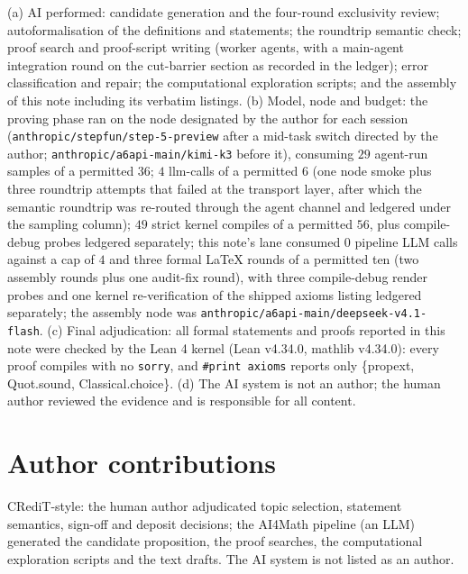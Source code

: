 \documentclass[11pt]{article}
\begin{document}
(a) AI performed: candidate generation and the four-round exclusivity
review; autoformalisation of the definitions and statements; the roundtrip
semantic check; proof search and proof-script writing (worker agents, with
a main-agent integration round on the cut-barrier section as recorded in
the ledger); error classification and repair; the computational exploration
scripts; and the assembly of this note including its verbatim listings.
(b) Model, node and budget: the proving phase ran on the node designated
by the author for each session (\texttt{anthropic/stepfun/step-5-preview}
after a mid-task switch directed by the author; \texttt{anthropic/a6api-main/kimi-k3}
before it), consuming $29$ agent-run samples of a permitted $36$; $4$
llm-calls of a permitted $6$ (one node smoke plus three roundtrip attempts
that failed at the transport layer, after which the semantic roundtrip was
re-routed through the agent channel and ledgered under the sampling
column); $49$ strict kernel compiles of a permitted $56$, plus
compile-debug probes ledgered separately; this note's lane consumed $0$
pipeline LLM calls against a cap of $4$ and three formal LaTeX rounds of a
permitted ten (two assembly rounds plus one audit-fix round), with three
compile-debug render probes and one kernel re-verification of the shipped
axioms listing ledgered separately; the assembly node was
\texttt{anthropic/a6api-main/deepseek-v4.1-flash}. (c) Final adjudication: all formal statements and proofs
reported in this note were checked by the Lean 4 kernel (Lean v4.34.0,
mathlib v4.34.0): every proof compiles with no \texttt{sorry}, and
\texttt{\#print axioms} reports only \{propext, Quot.sound,
Classical.choice\}. (d) The AI system is not an author; the human author
reviewed the evidence and is responsible for all content.

\section*{Author contributions}

CRediT-style: the human author adjudicated topic selection, statement
semantics, sign-off and deposit decisions; the AI4Math pipeline (an LLM)
generated the candidate proposition, the proof searches, the computational
exploration scripts and the text drafts. The AI system is not listed as an
author.
\end{document}
